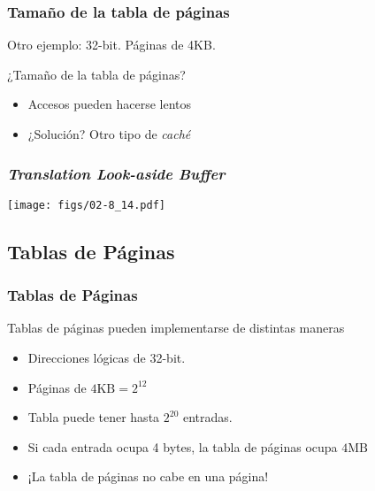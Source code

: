 \documentclass[letter]{beamer}
\begin{document}
\begin{frame}
  \frametitle{Tamaño de la tabla de páginas}

  Otro ejemplo: 32-bit. Páginas de 4KB.

  ¿Tamaño de la tabla de páginas?  
  \begin{itemize}
    \item <3->{Accesos pueden hacerse lentos}
    \item <4->{¿Solución? Otro tipo de {\em caché}}
  \end{itemize}
  

\end{frame}
\begin{frame}
  \frametitle{{\em Translation Look-aside Buffer}}

  \begin{center}
    \texttt{[image: figs/02-8\_14.pdf]}
  \end{center}

\end{frame}

\subsection{Tablas de Páginas}

\begin{frame}
  \frametitle{Tablas de Páginas}

  Tablas de páginas pueden implementarse de distintas maneras
  
  \begin{itemize}
    \item<3-> Direcciones lógicas de 32-bit. 
    \item<5-> Páginas de $4\text{KB}=2^{12}$
    \item<6-> Tabla puede tener hasta $2^{20}$ entradas. 
    \item<7-> Si cada entrada ocupa 4 bytes, la tabla de páginas ocupa $4\text{MB}$
    \item<8-> ¡La tabla de páginas no cabe en una página!
  \end{itemize}
\end{frame}
\end{document}
